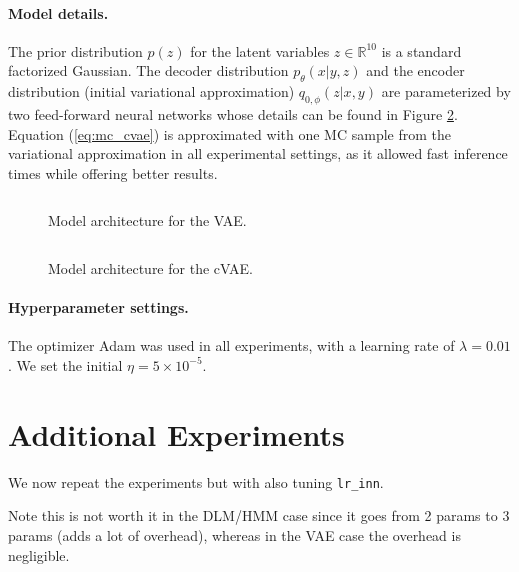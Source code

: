 \paragraph{Model details.}

The prior distribution $p(z)$ for the latent variables $z \in \mathbb{R}^{10}$ is a standard factorized Gaussian. The decoder distribution $p_\theta(x|y,z)$ and the encoder distribution (initial variational approximation) $q_{0,\phi}(z|x,y)$ are parameterized by two feed-forward neural networks whose details can be found in Figure \ref{fig:arch}.
Equation (\ref{eq:mc_cvae}) is approximated with one MC sample from the variational approximation in all experimental settings, {as it allowed fast inference times while offering better results.}


\begin{figure}[h]
\inputminted[fontsize=\scriptsize]{python}{img/arch_vae.tex}
\caption{Model architecture for the VAE.}
\label{fig:arch_vae}
\end{figure}
\unskip
\begin{figure}[h]

\inputminted[fontsize=\scriptsize]{python}{img/arch.tex}
\caption{Model architecture for the cVAE.}
\label{fig:arch}
\end{figure}


\paragraph{Hyperparameter settings.}
The optimizer Adam was used in all experiments, with a learning rate of $\lambda=0.01$. We set the initial $\eta = 5 \times 10^{-5}$.




\iffalse
\section{Additional Experiments}

We now repeat the experiments but with also tuning \texttt{lr\_inn}.

Note this is not worth it in the DLM/HMM case since it goes from 2 params to 3 params (adds a lot of overhead), whereas in the VAE case the overhead is negligible.



